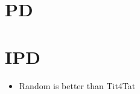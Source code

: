 \documentclass[]{article}
\begin{document}
\section{PD}
\section{IPD}

\begin{itemize}
	\item Random is better than Tit4Tat
\end{itemize}
\end{document}
